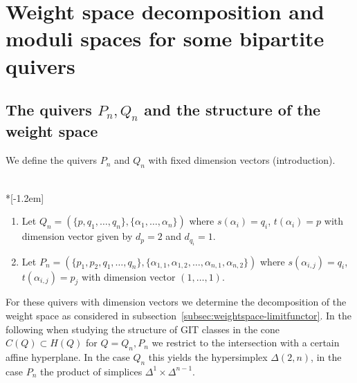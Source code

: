 \documentclass[ALCO,ThmDefs,Unicode,epreuves]{cedram}
\begin{document}
\section{Weight space decomposition and moduli spaces for some bipartite quivers}
\label{sec:weightspace-moduli-PnQn}

\subsection{The quivers \texorpdfstring{$P_n,Q_n$}{Pn,Qn} and the structure of the weight space}
\label{subsec:weightspacePnQn}

We define the quivers $P_n$ and $Q_n$ with fixed dimension vectors (\cf introduction).

\begin{defi}\ \\*[-1.2em]
\begin{enumerate}[label=(\alph*)]
\item\label{defi2.1_a} %
Let
$Q_n=(\{p,q_1,\ldots,q_n\},\{\alpha_1,\ldots,\alpha_n\})$
where $s(\alpha_i)=q_i$, $t(\alpha_i)=p$ with dimension vector given by $d_p=2$ 
and $d_{q_i}=1$. %

\item\label{defi2.1_b} %
Let $P_n=(\{p_1,p_2,q_1,\ldots,q_n\},\{\alpha_{1,1},\alpha_{1,2},\ldots,
\alpha_{n,1},\alpha_{n,2}\})$
where $s(\alpha_{i,j})=q_i$, $t(\alpha_{i,j})=p_j$ with dimension 
vector $(1,\ldots,1)$.
\end{enumerate}
\end{defi}

For these quivers with dimension vectors we determine the decomposition of the 
weight space as considered in subsection~\ref{subsec:weightspace-limitfunctor}. 
In the following when studying the structure of GIT classes in the cone 
$C(Q)\subset H(Q)$ for $Q=Q_n,P_n$ we restrict to the intersection with 
a certain affine hyperplane. In the case $Q_n$ this yields the hypersimplex 
$\Delta(2,n)$, in the case $P_n$ the product of simplices $\Delta^1\times\Delta^{n-1}$.
\end{document}
